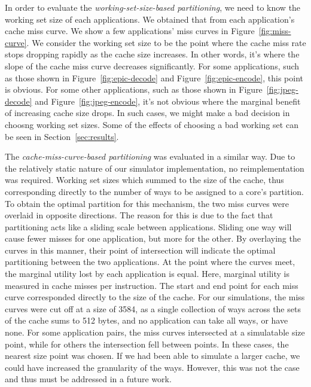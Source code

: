 \documentclass{acm_proc_article-sp}
\begin{document}
In order to evaluate the \emph{working-set-size-based partitioning}, we need to 
know the working set size of each applications. We obtained that from each 
application's cache miss curve. We show a few applications' miss curves in Figure~\ref{fig:miss-curve}. 
We consider the working set size to be the point where the cache miss rate stops dropping rapidly as the cache size increases. In other words, it's where the slope of the cache miss curve decreases 
significantly. For some applications, such as those shown in 
Figure~\ref{fig:epic-decode} and Figure~\ref{fig:epic-encode}, this point is 
obvious. For some other applications, such as those shown in 
Figure~\ref{fig:jpeg-decode} and Figure~\ref{fig:jpeg-encode}, it's not obvious
where the marginal benefit of increasing cache size drops. In such cases, we 
might make a bad decision in choosng working set sizes. Some of the
effects of choosing a bad working set can be seen in Section~\ref{sec:results}.

The \emph{cache-miss-curve-based partitioning} was evaluated in a similar way.
Due to the relatively static nature of our simulator implementation, no reimplementation
was required. Working set sizes which summed to the size of the cache, thus
corresponding directly to the number of ways to be assigned to a core's partition.
To obtain the optimal partition for this mechanism, the two miss curves were overlaid
in opposite directions. The reason for this is due to the fact that partitioning acts like a sliding scale
between applications. Sliding one way will cause fewer misses for one application, but more for the
other. By overlaying the curves in this manner, their point of intersection will indicate the optimal partitioning
between the two applications. At the point where the curves meet, the marginal utility lost by each application
is equal. Here, marginal utility is measured in cache misses per instruction. The start and end point for each miss curve corresponded directly to the size of the cache. For our simulations, the miss curves were cut off at a size of 3584,
as a single collection of ways across the sets of the cache sums to 512 bytes, and no
application can take all ways, or have none. For some application pairs, the miss curves intersected at a simulatable
size point, while for others the intersection fell between points. In these cases, the nearest size point was chosen. 
If we had been able to simulate a larger cache, we could have increased the granularity of the ways. However,
this was not the case and thus must be addressed in a future work.
\end{document}
